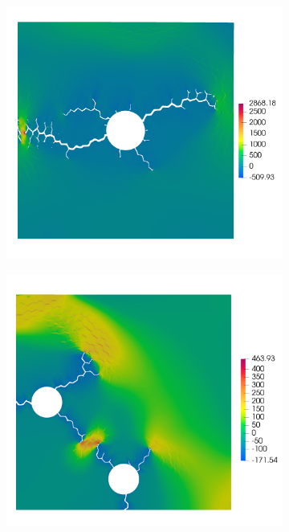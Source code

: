 \begin{frame}
  \vspace{-1.5em}
  \begin{columns}[T]
    \begin{column}{0.2\textwidth}
      \vspace{-1em}
      \begin{figure}
        \centering
        \begin{subfigure}{0.94\linewidth}
          \centering
          \includegraphics[width=0.9\linewidth]{Chapter345/figures/r25_ext0_stress}
        \end{subfigure}
        \begin{subfigure}{0.94\linewidth}
          \centering
          \includegraphics[width=0.9\linewidth]{Chapter345/figures/two_bubbles_stress}

\end{subfigure}
\end{figure}
\end{column}
\end{columns}
\end{frame}
